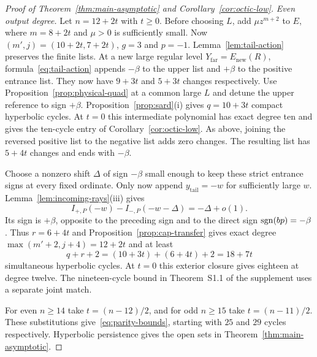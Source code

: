 \begin{proof}[Proof of Theorem~\ref{thm:main-asymptotic} and Corollary~\ref{cor:octic-low}]
\emph{Even output degree.}
Let $n=12+2t$ with $t\ge0$. Before choosing $L$, add $\mu z^{m+2}$ to
$E$, where $m=8+2t$ and $\mu>0$ is sufficiently small. Now
$(m',j)=(10+2t,7+2t)$, $g=3$ and $p=-1$. Lemma~\ref{lem:tail-action}
preserves the finite lists. At a new large regular level
$Y_{\mathrm{far}}=E_{\mathrm{new}}(R)$, formula~\eqref{eq:tail-action}
appends $-\beta$ to the upper list and $+\beta$ to the positive
entrance list. They now have $9+3t$ and $5+3t$ changes respectively.
Use Proposition~\ref{prop:physical-quad} at a common large $L$ and
detune the upper reference to sign $+\beta$. Proposition~\ref{prop:sard}(i)
gives $q=10+3t$ compact hyperbolic cycles. At $t=0$ this intermediate
polynomial has exact degree ten and gives the ten-cycle entry of
Corollary~\ref{cor:octic-low}. As above, joining the reversed
positive list to the negative list adds zero changes. The resulting list
has $5+4t$ changes and ends with $-\beta$.

Choose a nonzero shift $\Delta$ of sign $-\beta$ small enough to keep
these strict entrance signs at every fixed ordinate. Only now append
$y_{\mathrm{tail}}=-w$ for sufficiently large $w$.
Lemma~\ref{lem:incoming-rays}(iii) gives
\[
        I_{+,P}(-w)-I_{-,P}(-w-\Delta)=-\Delta+o(1).
\]
Its sign is $+\beta$, opposite to the preceding sign and to the direct
sign $\operatorname{sgn}(bp)=-\beta$. Thus $r=6+4t$ and
Proposition~\ref{prop:cap-transfer} gives exact degree
$\max(m'+2,j+4)=12+2t$ and at least
\[
                  q+r+2=(10+3t)+(6+4t)+2=18+7t
\]
simultaneous hyperbolic cycles. At $t=0$ this exterior closure gives
eighteen at degree twelve. The nineteen-cycle bound in Theorem~S1.1
of the supplement uses a separate joint match.

For even $n\ge14$ take $t=(n-12)/2$, and for odd $n\ge15$ take
$t=(n-11)/2$. These substitutions give~\eqref{eq:parity-bounds},
starting with $25$ and $29$ cycles respectively. Hyperbolic persistence gives the open sets in Theorem~\ref{thm:main-asymptotic}.
\end{proof}
